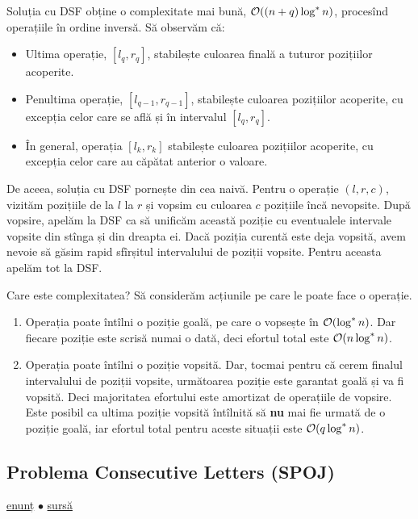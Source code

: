 \documentclass[../main.tex]{subfiles}
\begin{document}
Soluția cu DSF obține o complexitate mai bună, $\mathcal{O}((n + q) \log^{*} n)$, procesînd operațiile în ordine inversă. Să observăm că:

\begin{itemize}
  \item Ultima operație, $[l_q, r_q]$, stabilește culoarea finală a tuturor pozițiilor acoperite.
  \item Penultima operație, $[l_{q-1}, r_{q-1}]$, stabilește culoarea pozițiilor acoperite, cu excepția celor care se află și în intervalul $[l_q, r_q]$.
  \item În general, operația $[l_k, r_k]$ stabilește culoarea pozițiilor acoperite, cu excepția celor care au căpătat anterior o valoare.
\end{itemize}

De aceea, soluția cu DSF pornește din cea naivă. Pentru o operație $(l, r, c)$, vizităm pozițiile de la $l$ la $r$ și vopsim cu culoarea $c$ pozițiile încă nevopsite. După vopsire, apelăm la DSF ca să unificăm această poziție cu eventualele intervale vopsite din stînga și din dreapta ei. Dacă poziția curentă este deja vopsită, avem nevoie să găsim rapid sfîrșitul intervalului de poziții vopsite. Pentru aceasta apelăm tot la DSF.

Care este complexitatea? Să considerăm acțiunile pe care le poate face o operație.

\begin{enumerate}
  \item Operația poate întîlni o poziție goală, pe care o vopsește în $\mathcal{O}(\log^{*} n)$. Dar fiecare poziție este scrisă numai o dată, deci efortul total este $\mathcal{O}(n \log^{*} n)$.
  \item Operația poate întîlni o poziție vopsită. Dar, tocmai pentru că cerem finalul intervalului de poziții vopsite, următoarea poziție este garantat goală și va fi vopsită. Deci majoritatea efortului este amortizat de operațiile de vopsire. Este posibil ca ultima poziție vopsită întîlnită să \textbf{nu} mai fie urmată de o poziție goală, iar efortul total pentru aceste situații este $\mathcal{O}(q \log^{*} n)$.
\end{enumerate}


\subsection{Problema Consecutive Letters (SPOJ)}
\label{problem:consecutive-letters}

\href{https://www.spoj.com/problems/CONSEC/}{enunț}
$\bullet$
\hyperref[code:consecutive-letters]{sursă}
\end{document}
